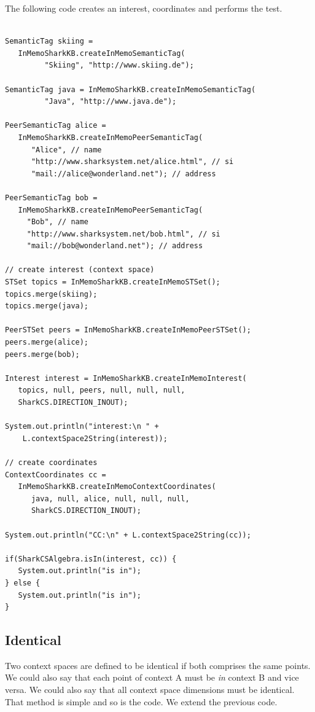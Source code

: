 The following code creates an interest, coordinates and performs the test.

\begin{verbatim}

SemanticTag skiing = 
   InMemoSharkKB.createInMemoSemanticTag(
         "Skiing", "http://www.skiing.de");

SemanticTag java = InMemoSharkKB.createInMemoSemanticTag(
         "Java", "http://www.java.de");

PeerSemanticTag alice = 
   InMemoSharkKB.createInMemoPeerSemanticTag(
      "Alice", // name
      "http://www.sharksystem.net/alice.html", // si
      "mail://alice@wonderland.net"); // address

PeerSemanticTag bob = 
   InMemoSharkKB.createInMemoPeerSemanticTag(
     "Bob", // name
     "http://www.sharksystem.net/bob.html", // si
     "mail://bob@wonderland.net"); // address

// create interest (context space)
STSet topics = InMemoSharkKB.createInMemoSTSet();
topics.merge(skiing);
topics.merge(java);

PeerSTSet peers = InMemoSharkKB.createInMemoPeerSTSet();
peers.merge(alice);
peers.merge(bob);

Interest interest = InMemoSharkKB.createInMemoInterest(
   topics, null, peers, null, null, null, 
   SharkCS.DIRECTION_INOUT);

System.out.println("interest:\n " + 
    L.contextSpace2String(interest));

// create coordinates
ContextCoordinates cc = 
   InMemoSharkKB.createInMemoContextCoordinates(
      java, null, alice, null, null, null, 
      SharkCS.DIRECTION_INOUT);

System.out.println("CC:\n" + L.contextSpace2String(cc));

if(SharkCSAlgebra.isIn(interest, cc)) {
   System.out.println("is in");
} else {
   System.out.println("is in");
}
\end{verbatim}

\subsection{Identical}
Two context spaces are defined to be identical if both comprises the same points. 
We could also say that each point of context A must be {\it in} context B and vice versa. We could also say that all context space dimensions must be identical. That method is simple and so is the code. We extend the previous code.

